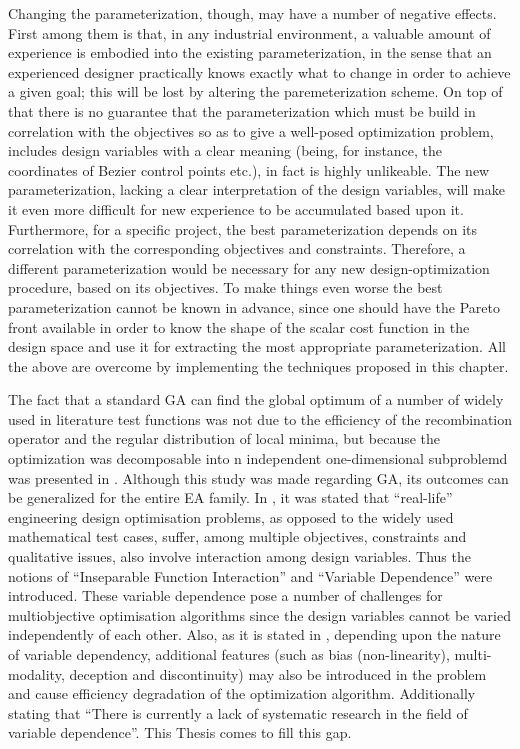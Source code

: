 Changing the parameterization, though, may have a number of negative effects. First among them is that, in any industrial environment, a valuable amount of experience is embodied into the existing parameterization, in the sense that an experienced designer practically knows exactly what to change in order to achieve a given goal; this will be lost by altering the paremeterization scheme. On top of that there is no guarantee that the parameterization which must be build in correlation with the objectives so as to give a well-posed optimization problem, includes design variables with a clear meaning (being, for instance, the coordinates of Bezier control points etc.), in fact is highly unlikeable. The new parameterization, lacking a clear interpretation of the design variables, will make it even more difficult for new experience to be accumulated based upon it. Furthermore, for a specific project, the best parameterization depends on its correlation with the corresponding  objectives and constraints. Therefore, a different parameterization would be necessary for any new design-optimization procedure, based on its objectives. To make things even worse the best parameterization cannot be known in advance, since one should have the Pareto front available in order to know the shape of the scalar cost function in the design space and use it for extracting the most appropriate parameterization. All the above are overcome by implementing the techniques proposed in this chapter.                 


The fact that a standard GA can find the global optimum of a number of widely used in literature test functions was not due to the efficiency of the recombination operator and the regular distribution of local minima, but because the optimization was decomposable into n independent one-dimensional subproblemd was presented in \citep{Salomon}. Although  this study was made regarding GA, its outcomes can be generalized for the entire EA family. In \cite{Roy_2002a,Roy_2002b},  it was stated that ``real-life'' engineering design optimisation problems, as opposed to the widely used mathematical test cases, suffer, among multiple objectives, constraints and qualitative issues, also involve interaction among design variables. Thus the notions of ``Inseparable Function Interaction'' and ``Variable Dependence'' were introduced. 
These variable dependence pose a number of challenges for multiobjective optimisation algorithms since the design variables cannot be varied independently of each other.
Also, as it is stated in \cite{Roy_2002b}, depending upon the nature of variable dependency, additional features (such as bias (non-linearity), multi-modality, deception and discontinuity) may also be introduced in the problem and cause efficiency degradation of the optimization algorithm. Additionally stating that ``There is currently a lack of systematic research in the field of variable dependence''. This Thesis comes to fill this gap. 



